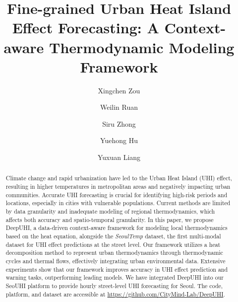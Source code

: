 \documentclass[sigconf]{acmart}
\def\model{DeepUHI\xspace}
\begin{document}
\title{Fine-grained Urban Heat Island Effect Forecasting: A Context-aware Thermodynamic Modeling Framework}
\author{Xingchen Zou}

\author{Weilin Ruan}

\author{Siru Zhong}

\author{Yuehong Hu}

\author{Yuxuan Liang}



\renewcommand{\shortauthors}{Xingchen Zou, Weilin Ruan, Siru Zhong, Yuehong Hu, \& Yuxuan Liang}

\begin{abstract}

Climate change and rapid urbanization have led to the Urban Heat Island (UHI) effect, resulting in higher temperatures in metropolitan areas and negatively impacting urban communities. Accurate UHI forecasting is crucial for identifying high-risk periods and locations, especially in cities with vulnerable populations. Current methods are limited by data granularity and inadequate modeling of regional thermodynamics, which affects both accuracy and spatio-temporal granularity. In this paper, we propose \model, a data-driven context-aware framework for modeling local thermodynamics based on the heat equation, alongside the \textit{SeoulTemp} dataset, the first multi-modal dataset for UHI effect predictions at the street level. Our framework utilizes a heat decomposition method to represent urban thermodynamics through thermodynamic cycles and thermal flows, effectively integrating urban environmental data. Extensive experiments show that our framework improves accuracy in UHI effect prediction and warning tasks, outperforming leading models. We have integrated \model into our SeoUHI platform to provide hourly street-level UHI forecasting for Seoul. The code, platform, and dataset are accessible at \url{https://github.com/CityMind-Lab/DeepUHI}.




\end{abstract}
\end{document}
